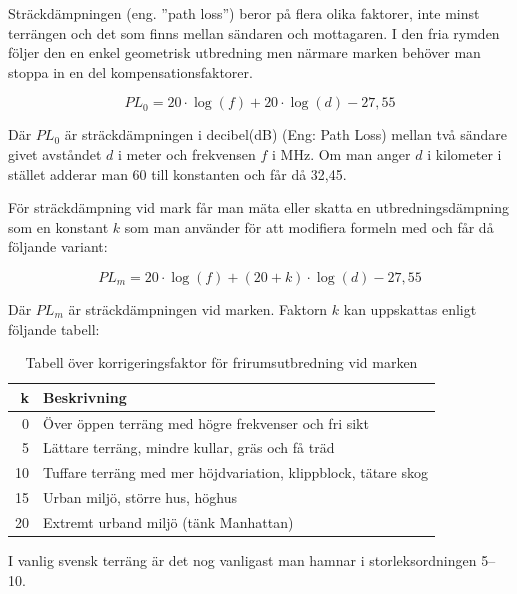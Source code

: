 Sträckdämpningen (eng. ''path loss'') beror på flera olika faktorer, inte minst
terrängen och det som finns mellan sändaren och mottagaren. I den fria rymden
följer den en enkel geometrisk utbredning men närmare marken behöver man stoppa
in en del kompensationsfaktorer.

\begin{equation}
	PL_0 = 20 \cdot \log(f) + 20 \cdot \log(d) - 27,55
\end{equation}

Där $PL_{0}$ är sträckdämpningen i decibel(dB) (Eng: Path Loss) mellan två
sändare givet avståndet $d$ i meter och frekvensen $f$ i MHz. Om man anger $d$
i kilometer i stället adderar man 60 till konstanten och får då 32,45.

För sträckdämpning vid mark får man mäta eller skatta en utbredningsdämpning
som en konstant $k$ som man använder för att modifiera formeln med och får då
följande variant:

\begin{equation}
	PL_m = 20 \cdot \log(f) + (20+k) \cdot \log(d) - 27,55
\end{equation}

Där $PL_m$ är sträckdämpningen vid marken. Faktorn $k$ kan uppskattas enligt
följande tabell:

\begin{table}[H]
	\begin{centering}
		\begin{tabular}{r|l}
			\textbf{k} & \textbf{Beskrivning} \\ \hline
			0 & Över öppen terräng med högre frekvenser och fri sikt\\
			5 & Lättare terräng, mindre kullar, gräs och få träd \\
			10 & Tuffare terräng med mer höjdvariation, klippblock, tätare skog \\
			15 & Urban miljö, större hus, höghus \\
			20 & Extremt urband miljö (tänk Manhattan)\\
		\end{tabular}
	\end{centering}
	\label{tab:frirum-faktor}
	\caption{Tabell över korrigeringsfaktor för frirumsutbredning vid marken}
\end{table}

I vanlig svensk terräng är det nog vanligast man hamnar i storleksordningen
5--10.


